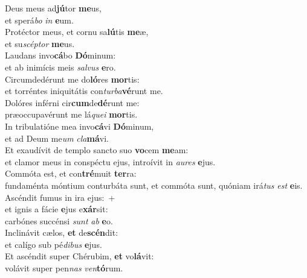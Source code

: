 \evenverse Deus meus ad\textbf{jú}tor \textbf{me}us,~\*\\
\evenverse et sperá\textit{bo} \textit{in} \textbf{e}um.\\
\oddverse Protéctor meus, et cornu sa\textbf{lú}tis \textbf{me}æ,~\*\\
\oddverse et su\textit{scép}\textit{tor} \textbf{me}us.\\
\evenverse Laudans invo\textbf{cá}bo \textbf{Dó}minum:~\*\\
\evenverse et ab inimícis meis \textit{sal}\textit{vus} \textbf{e}ro.\\
\oddverse Circumdedérunt me do\textbf{ló}res \textbf{mor}tis:~\*\\
\oddverse et torréntes iniquitátis con\textit{tur}\textit{ba}\textbf{vé}runt me.\\
\evenverse Dolóres inférni cir\textbf{cum}de\textbf{dé}runt me:~\*\\
\evenverse præoccupavérunt me lá\textit{que}\textit{i} \textbf{mor}tis.\\
\oddverse In tribulatióne mea invo\textbf{cá}vi \textbf{Dó}minum,~\*\\
\oddverse et ad Deum me\textit{um} \textit{cla}\textbf{má}vi.\\
\evenverse Et exaudívit de templo sancto suo \textbf{vo}cem \textbf{me}am:~\*\\
\evenverse et clamor meus in conspéctu ejus, introívit in \textit{au}\textit{res} \textbf{e}jus.\\
\oddverse Commóta est, et con\textbf{tré}muit \textbf{ter}ra:~\*\\
\oddverse fundaménta móntium conturbáta sunt, et commóta sunt, quóniam irá\textit{tus} \textit{est} \textbf{e}is.\\
\evenverse Ascéndit fumus in ira ejus:~+\\
\evenverse  et ignis a fácie \textbf{e}jus e\textbf{xár}sit:~\*\\
\evenverse carbónes succénsi \textit{sunt} \textit{ab} \textbf{e}o.\\
\oddverse Inclinávit cælos, \textbf{et} de\textbf{scén}dit:~\*\\
\oddverse et calígo sub pé\textit{di}\textit{bus} \textbf{e}jus.\\
\evenverse Et ascéndit super Chérubim, \textbf{et} vo\textbf{lá}vit:~\*\\
\evenverse volávit super pen\textit{nas} \textit{ven}\textbf{tó}rum.\\

